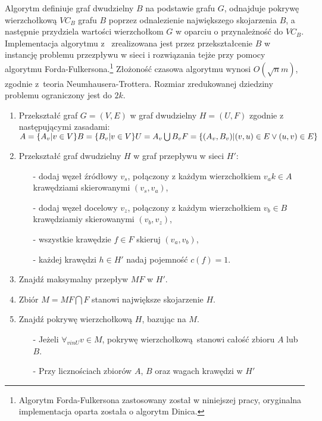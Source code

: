 Algorytm definiuje graf dwudzielny $B$ na podstawie grafu $G$, odnajduje pokrywę
wierzchołkową $VC_B$ grafu $B$ poprzez odnalezienie największego skojarzenia $B$,
a następnie przydziela wartości wierzchołkom $G$ w oparciu o przynależność do
$VC_B$.
Implementacja algorytmu z~\cite{Niedermeier02} zrealizowana jest przez
przekształcenie $B$ w instancję problemu przezpływu w sieci i rozwiązania tejże
przy pomocy algorytmu Forda-Fulkersona.\footnote{Algorytm Forda-Fulkersona
  zastosowany został w niniejszej pracy, oryginalna implementacja oparta została
o algorytm Dinica.}
Złożoność czasowa algorytmu wynosi $O(\sqrt{n}m)$, zgodnie z~teoria
Neumhausera-Trottera.
Rozmiar zredukowanej dziedziny problemu ograniczony jest do $2k$.

\begin{enumerate}
  \item Przekształć graf $G=(V,E)$ w graf dwudzielny $H=(U,F)$ zgodnie z
    następującymi zasadami:\\
    $A=\{A_v|v \in V\}\\
    B=\{B_v|v \in V\}\\
    U=A_v \bigcup B_v
    F=\{(A_v, B_v)|(v,u) \in E \lor (u,v) \in E\}$
  \item Przekształć graf dwudzielny $H$ w graf przepływu w sieci $H\prime$:
    \begin{itemize}
      \item[-] dodaj węzeł źródłowy $v_s$, połączony z każdym wierzchołkiem $v_a
        k\in A$ krawędziami skierowanymi $(v_s, v_a)$,
      \item[-] dodaj węzeł docelowy $v_z$, połączony z każdym wierzchołkiem $v_b
        \in B$ krawędziamiy skierowanymi $(v_b, v_z)$,
      \item[-] wszystkie krawędzie $f \in F$ skieruj $(v_a, v_b)$,
      \item[-] każdej krawędzi $h \in H\prime$ nadaj pojemność $c(f)=1$.
    \end{itemize}
  \item Znajdź maksymalny przepływ $MF$ w $H\prime$.
  \item Zbiór $M=MF \bigcap F$ stanowi największe skojarzenie $H$.
  \item Znajdź pokrywę wierzchołkową $H$, bazując na $M$.
    \begin{itemize}
      \item[-] Jeżeli $\forall_{v in U}{v \in M}$, pokrywę
        wierzchołkową~stanowi całość zbioru $A$ lub $B$.
      \item[-] Przy licznościach zbiorów $A$, $B$ oraz wagach krawędzi w $H\prime$

\end{itemize}
\end{enumerate}
